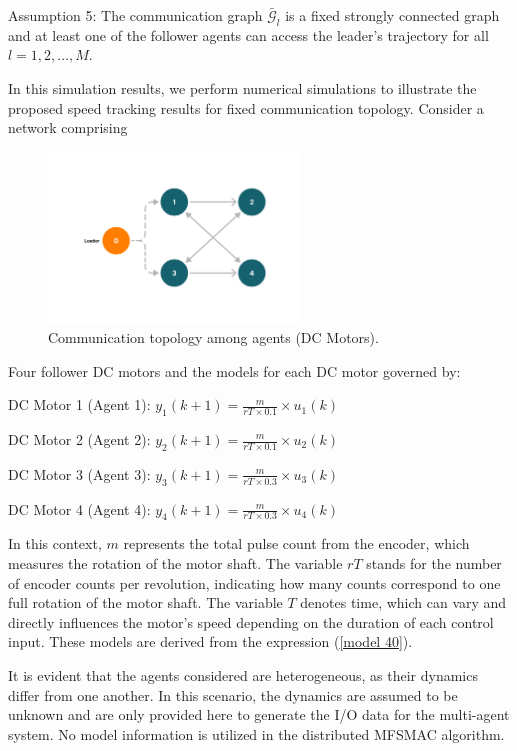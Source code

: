 \documentclass[journal,onecolumn]{IEEEtran}
\begin{document}
Assumption 5: The communication graph \(\bar{\mathcal{G}}_l\) is a fixed strongly connected graph and at least one of the follower agents can access the leader's trajectory for all \(l = 1,2,\dots,M\).

In this simulation results, we perform numerical simulations to illustrate the proposed speed tracking results for fixed communication topology. Consider a network comprising

\begin{figure}[h!]
    \centering
    \includegraphics[width=0.6\textwidth]{communication.png}
    \caption{Communication topology among agents (DC Motors).}
    \label{fig:communication1} %
\end{figure}

Four follower DC motors and the models for each DC motor governed by:

DC Motor 1 (Agent 1): \(y_1(k+1)=\frac{m}{rT \times 0.1} \times u_1(k)\)

DC Motor 2 (Agent 2): \(y_2(k+1)=\frac{m}{rT \times 0.1} \times u_2(k)\)

DC Motor 3 (Agent 3): \(y_3(k+1)=\frac{m}{rT \times 0.3} \times u_3(k)\)

DC Motor 4 (Agent 4): \(y_4(k+1)=\frac{m}{rT \times 0.3 } \times u_4(k)\)

In this context, \( m \) represents the total pulse count from the encoder, which measures the rotation of the motor shaft. The variable \( rT \) stands for the number of encoder counts per revolution, indicating how many counts correspond to one full rotation of the motor shaft. The variable \( T \) denotes time, which can vary and directly influences the motor's speed depending on the duration of each control input. These models are derived from the expression (\ref{model 40}).

It is evident that the agents considered are heterogeneous, as their dynamics differ from one another. In this scenario, the dynamics are assumed to be unknown and are only provided here to generate the I/O data for the multi-agent system. No model information is utilized in the distributed MFSMAC algorithm.
\end{document}
